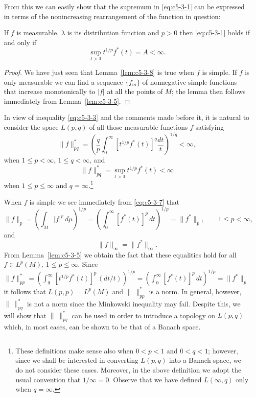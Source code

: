 From this we can easily show that the supremum in \eqref{eq:c5-3-1} can be
expressed in terms of the nonincreasing rearrangement of the function in
question:

\begin{lemma}\label{lem:c5-3-8}
If $f$ is measurable, $\lambda$ is its distribution function and $p > 0$ then
\eqref{eq:c5-3-1} holds if and only if
\[
\sup_{t>0}t^{1/p}f^{*}(t)=A<\infty.
\]
\end{lemma}

\begin{proof}
We have just seen that Lemma~\ref{lem:c5-3-8} is true when $f$ is simple. If
$f$ is only measurable we can find a sequence $\{f_{m}\}$ of nonnegative simple
functions that increase monotonically to $|f|$ at all the points of $M$; the
lemma then follows immediately from Lemma~\ref{lem:c5-3-5}.
\end{proof}

In view of inequality \eqref{eq:c5-3-3} and the comments made before it, it is
natural to consider the space $L(p, q)$ of all those measurable functions $f$
satisfying
\[
\|f\|_{pq}^{*}=\left(\frac{q}{p}\int_{0}^{\infty}[t^{1/p}f^{*}(t)]^{q}\frac{dt}{t}\right)^{1/q}<\infty,
\]
when $1 \leq p < \infty$, $1 \leq q < \infty$, and
\[
\|f\|_{pq}^{*}=\sup_{t>0}t^{1/p}f^{*}(t)<\infty
\]
when $1 \leq p \leq \infty$ and $q = \infty$.\footnote{These definitions make
sense also when $0 < p < 1$ and $0 < q < 1$; however, since we shall be
interested in converting $L(p, q)$ into a Banach space, we do not consider
these cases. Moreover, in the above definition we adopt the usual convention
that $1/\infty = 0$. Observe that we have defined $L(\infty, q)$ only when
$q = \infty$.}

When $f$ is simple we see immediately from \eqref{eq:c5-3-7} that
\begin{equation}\label{eq:c5-3-9}
\|f\|_{p}=\left(\int_{M}|f|^{p}\,d\mu\right)^{1/p}
=\left(\int_{0}^{\infty}[f^{*}(t)]^{p}\,dt\right)^{1/p}=\|f^{*}\|_{p},
\qquad 1 \leq p < \infty,
\end{equation}
and
\begin{equation}\label{eq:c5-3-9p}
\tag{3.9$'$}
\|f\|_{\infty}=\|f^{*}\|_{\infty}.
\end{equation}
From Lemma~\ref{lem:c5-3-5} we obtain the fact that these equalities hold for
all $f \in L^{p}(M)$, $1 \leq p \leq \infty$. Since
$\|f\|_{pp}^{*} = (\int_{0}^{\infty}[t^{1/p}f^{*}(t)]^{p}\,(dt/t))^{1/p} = (\int_{0}^{\infty}[f^{*}(t)]^{p}\,dt)^{1/p} = \|f^{*}\|_{p}$
it follows that $L(p, p) = L^{p}(M)$ and $\|\ \|_{pp}^{*}$ is a norm. In
general, however, $\|\ \|_{pq}^{*}$ is not a norm since the Minkowski
inequality may fail. Despite this, we will show that $\|\ \|_{pq}^{*}$ can be
used in order to introduce a topology on $L(p, q)$ which, in most cases, can be
shown to be that of a Banach space.

